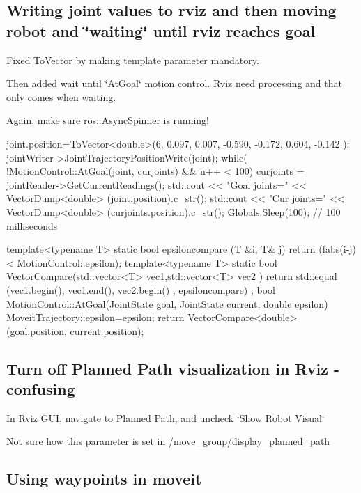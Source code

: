 \subsection*{Writing joint values to rviz and then moving robot and \char`\"{}waiting\char`\"{} until rviz reaches goal }

Fixed To\-Vector by making template parameter mandatory.

Then added wait until \char`\"{}\-At\-Goal\char`\"{} motion control. Rviz need processing and that only comes when waiting.

Again, make sure ros\-::\-Async\-Spinner is running! \begin{DoxyVerb}        joint.position=ToVector<double>(6, 0.097, 0.007, -0.590, -0.172, 0.604, -0.142 );
        jointWriter->JointTrajectoryPositionWrite(joint);
        while( !MotionControl::AtGoal(joint, curjoints) && n++ < 100) {
            curjoints = jointReader->GetCurrentReadings();
            std::cout << "Goal joints=" << VectorDump<double> (joint.position).c_str();
            std::cout << "Cur  joints=" << VectorDump<double> (curjoints.position).c_str();
            Globals.Sleep(100); // 100 milliseconds
        }

template<typename T>
static bool epsiloncompare (T &i, T& j) {
  return (fabs(i-j) < MotionControl::epsilon);
}
template<typename T>
static bool VectorCompare(std::vector<T> vec1,std::vector<T> vec2 )
{
   return std::equal (vec1.begin(), vec1.end(),  vec2.begin() , epsiloncompare) ;
}
bool MotionControl::AtGoal(JointState goal, JointState current,  double epsilon)
{
    MoveitTrajectory::epsilon=epsilon;
    return VectorCompare<double>(goal.position, current.position);
}
\end{DoxyVerb}


\subsection*{Turn off Planned Path visualization in Rviz -\/ confusing }

In Rviz G\-U\-I, navigate to Planned Path, and uncheck \char`\"{}\-Show Robot Visual\char`\"{}

Not sure how this parameter is set in /move\-\_\-group/display\-\_\-planned\-\_\-path

\subsection*{Using waypoints in moveit }

